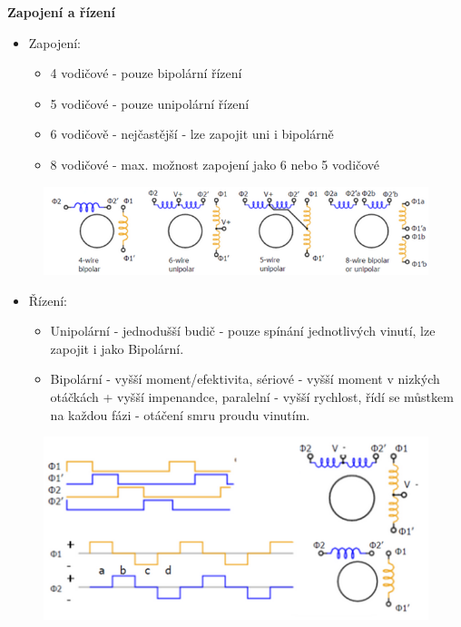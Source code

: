 \textbf{Zapojení a řízení}
\begin{itemize}
  \item Zapojení: \begin{itemize}
    \item 4 vodičové - pouze bipolární řízení
    \item 5 vodičové - pouze unipolární řízení
    \item 6 vodičově - nejčastější - lze zapojit uni i bipolárně
    \item 8 vodičové - max. možnost zapojení jako 6 nebo 5 vodičové
  \end{itemize}
\end{itemize}

\begin{figure}[h]
  \begin{center}
    \includegraphics[scale = 1]{img/picture8.png}
  \end{center}
\end{figure}

\begin{itemize}
  \item Řízení: \begin{itemize}
    \item Unipolární - jednodušší budič - pouze spínání jednotlivých vinutí, lze zapojit i jako Bipolární.
    \item Bipolární - vyšší moment/efektivita, sériové - vyšší moment v nizkých otáčkách + vyšší impenandce, paralelní - vyšší rychlost, řídí se můstkem na každou fázi - otáčení smru proudu vinutím.
  \end{itemize}
\end{itemize}

\begin{figure}[h]
  \begin{center}
    \includegraphics[scale = 1]{img/Picture9.png}
  \end{center}
\end{figure}

